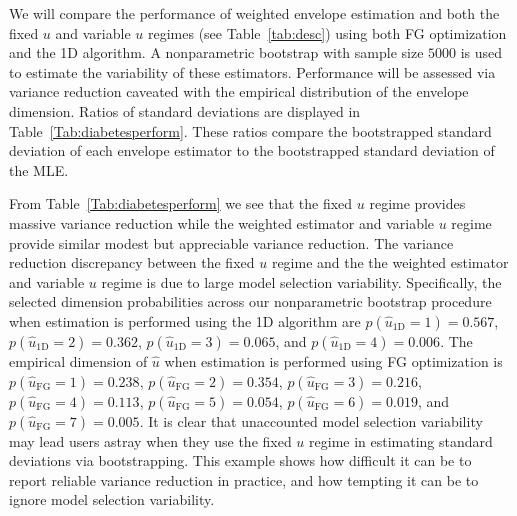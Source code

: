 \documentclass{article}\usepackage[]{graphicx}\usepackage[]{color}
\begin{document}
We will compare the performance of weighted envelope estimation and both the fixed $u$ and variable $u$ regimes (see Table~\ref{tab:desc}) using both FG optimization and the 1D algorithm. A nonparametric bootstrap with sample size $5000$ is used to estimate the variability of these estimators. Performance will be assessed via variance reduction caveated with the empirical distribution of the envelope dimension. Ratios of standard deviations are displayed in Table~\ref{Tab:diabetesperform}. These ratios compare the bootstrapped standard deviation of each envelope estimator to the bootstrapped standard deviation of the MLE.

From Table~\ref{Tab:diabetesperform} we see that the fixed $u$ regime provides massive variance reduction while the weighted estimator and variable $u$ regime provide similar modest but appreciable variance reduction. The variance reduction discrepancy between the fixed $u$ regime and the the weighted estimator and variable $u$ regime is due to large model selection variability. Specifically, the selected dimension probabilities across our nonparametric bootstrap procedure when estimation is performed using the 1D algorithm are $p(\hat{u}_{\text{1D}} = 1) = 0.567$, $p(\hat{u}_{\text{1D}} = 2) = 0.362$, $p(\hat{u}_{\text{1D}} = 3) = 0.065$, and $p(\hat{u}_{\text{1D}} = 4) = 0.006$. The empirical dimension of $\hat u$ when estimation is performed using FG optimization is 
$p(\hat{u}_{\text{FG}} = 1) = 0.238$, 
$p(\hat{u}_{\text{FG}} = 2) = 0.354$, 
$p(\hat{u}_{\text{FG}} = 3) = 0.216$, 
$p(\hat{u}_{\text{FG}} = 4) = 0.113$, 
$p(\hat{u}_{\text{FG}} = 5) = 0.054$, 
$p(\hat{u}_{\text{FG}} = 6) = 0.019$, and 
$p(\hat{u}_{\text{FG}} = 7) = 0.005$. 
It is clear that unaccounted model selection variability may lead users astray when they use the fixed $u$ regime in estimating standard deviations via bootstrapping. This example shows how difficult it can be to report reliable variance reduction in practice, and how tempting it can be to ignore model selection variability.
\end{document}
